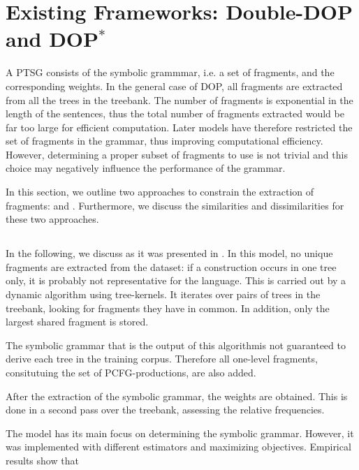 
\section{Existing Frameworks: Double-DOP and DOP$^*$}

A PTSG consists of the symbolic grammmar, i.e. a set of fragments, and the corresponding weights. In the general case of DOP, all fragments are extracted from all the trees in the treebank. The number of fragments is exponential in the length of the sentences, thus the total number of fragments extracted would be far too large for efficient computation. 
Later models have therefore restricted the set of fragments in the grammar, thus improving computational efficiency. However, determining a proper subset of fragments to use is not trivial and this choice may negatively influence the performance of the grammar.


In this section, we outline two approaches to constrain the extraction of fragments: \ddop and \dops. Furthermore, we discuss the similarities and dissimilarities for these two approaches. 

\subsection{\ddop}
In the following, we discuss \ddop{} as it was presented in \cite{sangati2011}. In this model, no unique fragments are extracted from the dataset: if a construction occurs in one tree only, it is probably not representative for the language. This is carried out by a dynamic algorithm using tree-kernels. It iterates over pairs of trees in the treebank, looking for fragments they have in common. In addition, only the largest shared fragment is stored. 

The symbolic grammar that is the output of this algorithmis not guaranteed to derive each tree in the training corpus. Therefore all one-level fragments, consitutuing the set of PCFG-productions, are also added.

After the extraction of the symbolic grammar, the weights are obtained. This is done in a second pass over the treebank, assessing the relative frequencies. 

The \ddop{} model has its main focus on determining the symbolic grammar. However, it was implemented with different estimators and maximizing objectives. Empirical results show that %

